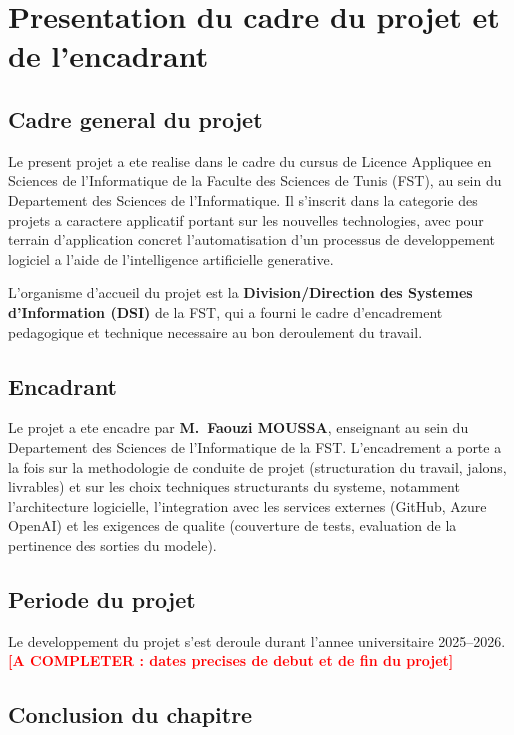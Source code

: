 \documentclass[a4paper,12pt,oneside]{report}
\newcommand{\todo}[1]{\textcolor{red}{\textbf{[A COMPLETER : #1]}}}
\begin{document}
\chapter{Presentation du cadre du projet et de l'encadrant}

\section{Cadre general du projet}

Le present projet a ete realise dans le cadre du cursus de Licence Appliquee en Sciences de l'Informatique de la Faculte des Sciences de Tunis (FST), au sein du Departement des Sciences de l'Informatique. Il s'inscrit dans la categorie des projets a caractere applicatif portant sur les nouvelles technologies, avec pour terrain d'application concret l'automatisation d'un processus de developpement logiciel a l'aide de l'intelligence artificielle generative.

L'organisme d'accueil du projet est la \textbf{Division/Direction des Systemes d'Information (DSI)} de la FST, qui a fourni le cadre d'encadrement pedagogique et technique necessaire au bon deroulement du travail.

\section{Encadrant}

Le projet a ete encadre par \textbf{M.~Faouzi MOUSSA}, enseignant au sein du Departement des Sciences de l'Informatique de la FST. L'encadrement a porte a la fois sur la methodologie de conduite de projet (structuration du travail, jalons, livrables) et sur les choix techniques structurants du systeme, notamment l'architecture logicielle, l'integration avec les services externes (GitHub, Azure OpenAI) et les exigences de qualite (couverture de tests, evaluation de la pertinence des sorties du modele).

\section{Periode du projet}

Le developpement du projet s'est deroule durant l'annee universitaire 2025--2026. \todo{dates precises de debut et de fin du projet}

\section*{Conclusion du chapitre}
\end{document}
